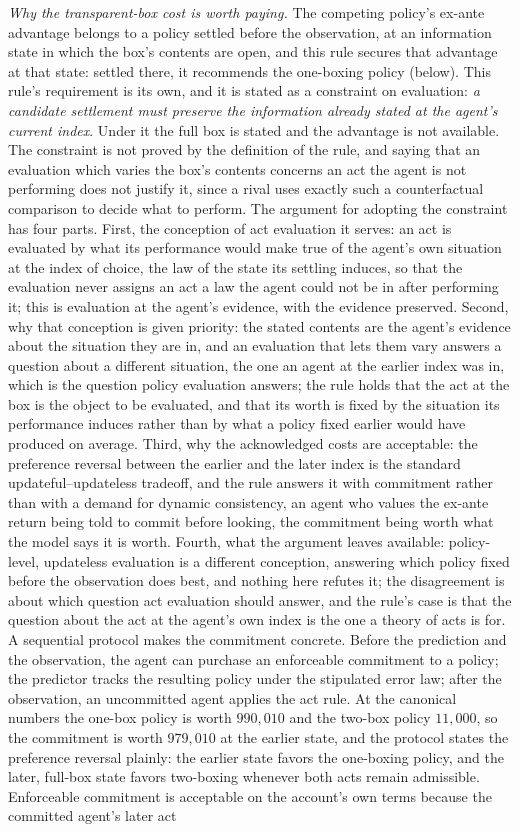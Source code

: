 \textit{Why the transparent-box cost is worth paying.} The competing policy's ex-ante advantage belongs to a policy settled before the observation, at an information state in which the box's contents are open, and this rule secures that advantage at that state: settled there, it recommends the one-boxing policy (below). This rule's requirement is its own, and it is stated as a constraint on evaluation: \emph{a candidate settlement must preserve the information already stated at the agent's current index}. Under it the full box is stated and the advantage is not available. The constraint is not proved by the definition of the rule, and saying that an evaluation which varies the box's contents concerns an act the agent is not performing does not justify it, since a rival uses exactly such a counterfactual comparison to decide what to perform. The argument for adopting the constraint has four parts. First, the conception of act evaluation it serves: an act is evaluated by what its performance would make true of the agent's own situation at the index of choice, the law of the state its settling induces, so that the evaluation never assigns an act a law the agent could not be in after performing it; this is evaluation at the agent's evidence, with the evidence preserved. Second, why that conception is given priority: the stated contents are the agent's evidence about the situation they are in, and an evaluation that lets them vary answers a question about a different situation, the one an agent at the earlier index was in, which is the question policy evaluation answers; the rule holds that the act at the box is the object to be evaluated, and that its worth is fixed by the situation its performance induces rather than by what a policy fixed earlier would have produced on average. Third, why the acknowledged costs are acceptable: the preference reversal between the earlier and the later index is the standard updateful--updateless tradeoff, and the rule answers it with commitment rather than with a demand for dynamic consistency, an agent who values the ex-ante return being told to commit before looking, the commitment being worth what the model says it is worth. Fourth, what the argument leaves available: policy-level, updateless evaluation is a different conception, answering which policy fixed before the observation does best, and nothing here refutes it; the disagreement is about which question act evaluation should answer, and the rule's case is that the question about the act at the agent's own index is the one a theory of acts is for. A sequential protocol makes the commitment concrete. Before the prediction and the observation, the agent can purchase an enforceable commitment to a policy; the predictor tracks the resulting policy under the stipulated error law; after the observation, an uncommitted agent applies the act rule. At the canonical numbers the one-box policy is worth $990{,}010$ and the two-box policy $11{,}000$, so the commitment is worth $979{,}010$ at the earlier state, and the protocol states the preference reversal plainly: the earlier state favors the one-boxing policy, and the later, full-box state favors two-boxing whenever both acts remain admissible. Enforceable commitment is acceptable on the account's own terms because the committed agent's later act 